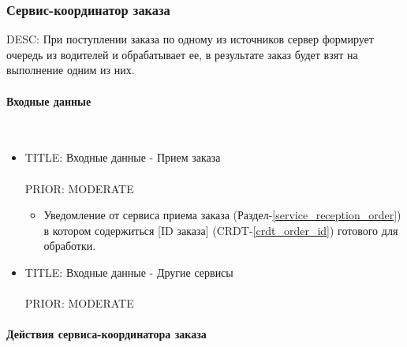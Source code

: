 \subsubsection{Сервис-координатор заказа} \label{selection_drivers_for_the_order}

    DESC:  При поступлении заказа по одному из источников сервер формирует очередь из водителей и обрабатывает ее, в результате заказ будет взят на выполнение одним из них. 

    \paragraph{Входные данные} \mbox{} \\ \label{}

	  \begin{itemize}

	    \item{

	      TITLE: Входные данные - Прием заказа\\
	      \\
	      PRIOR: MODERATE\\

	    }

		    \begin{itemize}
		      \item Уведомление от сервиса приема заказа (Раздел-\ref{service_reception_order}) в котором содержиться [ID заказа] (CRDT-\ref{crdt_order_id}) готового для обработки.
		    \end{itemize}

	    \item{

	      TITLE: Входные данные - Другие сервисы\\
	      \\
	      PRIOR: MODERATE\\

	    }

	  \end{itemize}

	\paragraph{Действия сервиса-координатора заказа} \mbox{} \\ \label{}

